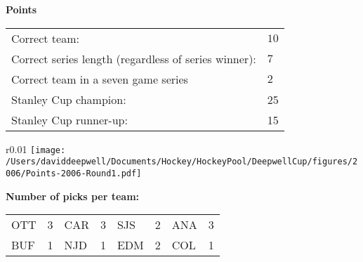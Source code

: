 \documentclass[10pt]{article}
\begin{document}
\begin{table}[!htb]
\begin{minipage}[t]{.27\linewidth}
{\bf Points}\\
\begin{tabular}{l l}
    Correct team:	& $10$\\
    Correct series length (regardless of series winner):	& $7$\\
    Correct team in a seven game series    & $2$\\
    Stanley Cup champion:	& 25\\
    Stanley Cup runner-up:	& 15\\
\end{tabular}
\hspace{0.5cm}
\begin{wrapfigure}{r}{0.01\textwidth}
    \vspace{-3cm}
	\texttt{[image: /Users/daviddeepwell/Documents/Hockey/HockeyPool/DeepwellCup/figures/2006/Points-2006-Round1.pdf]}
\end{wrapfigure}
\end{minipage}
\end{table}

\begin{minipage}[t]{.45\linewidth}
{\bf Number of picks per team:}\\
\begin{tabular}{lc | lc | lc | lc }
    OTT & 3 & CAR & 3 & SJS & 2 & ANA & 3 \\
    BUF & 1 & NJD & 1 & EDM & 2 & COL & 1 \\
\end{tabular}
\end{minipage}
\end{document}
